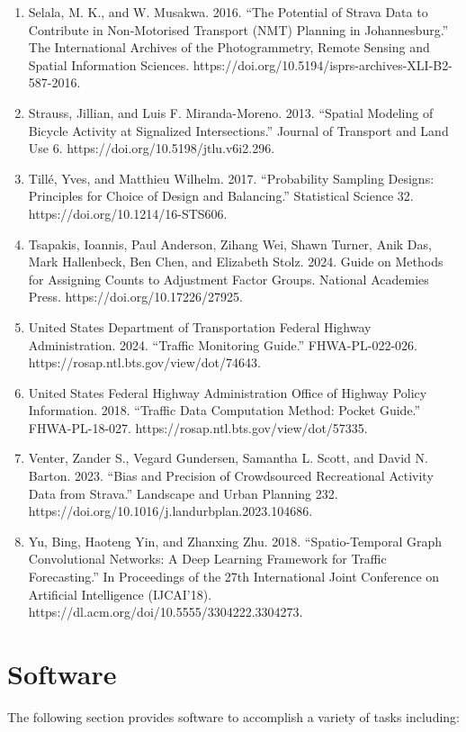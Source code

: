 \documentclass[11pt]{article}
\begin{document}
\begin{enumerate}
\item
  Selala, M. K., and W. Musakwa. 2016. ``The Potential of Strava Data to
  Contribute in Non-Motorised Transport (NMT) Planning in
  Johannesburg.'' The International Archives of the Photogrammetry,
  Remote Sensing and Spatial Information Sciences.
  https://doi.org/10.5194/isprs-archives-XLI-B2-587-2016.
\item
  Strauss, Jillian, and Luis F. Miranda-Moreno. 2013. ``Spatial Modeling
  of Bicycle Activity at Signalized Intersections.'' Journal of
  Transport and Land Use 6. https://doi.org/10.5198/jtlu.v6i2.296.
\item
  Tillé, Yves, and Matthieu Wilhelm. 2017. ``Probability Sampling
  Designs: Principles for Choice of Design and Balancing.'' Statistical
  Science 32. https://doi.org/10.1214/16-STS606.
\item
  Tsapakis, Ioannis, Paul Anderson, Zihang Wei, Shawn Turner, Anik Das,
  Mark Hallenbeck, Ben Chen, and Elizabeth Stolz. 2024. Guide on Methods
  for Assigning Counts to Adjustment Factor Groups. National Academies
  Press. https://doi.org/10.17226/27925.
\item
  United States Department of Transportation Federal Highway
  Administration. 2024. ``Traffic Monitoring Guide.'' FHWA-PL-022-026.
  https://rosap.ntl.bts.gov/view/dot/74643.
\item
  United States Federal Highway Administration Office of Highway Policy
  Information. 2018. ``Traffic Data Computation Method: Pocket Guide.''
  FHWA-PL-18-027. https://rosap.ntl.bts.gov/view/dot/57335.
\item
  Venter, Zander S., Vegard Gundersen, Samantha L. Scott, and David N.
  Barton. 2023. ``Bias and Precision of Crowdsourced Recreational
  Activity Data from Strava.'' Landscape and Urban Planning 232.
  https://doi.org/10.1016/j.landurbplan.2023.104686.
\item
  Yu, Bing, Haoteng Yin, and Zhanxing Zhu. 2018. ``Spatio-Temporal Graph
  Convolutional Networks: A Deep Learning Framework for Traffic
  Forecasting.'' In Proceedings of the 27th International Joint
  Conference on Artificial Intelligence (IJCAI'18).
  https://dl.acm.org/doi/10.5555/3304222.3304273.
\end{enumerate}

    \section{Software}\label{software}

The following section provides software to accomplish a variety of
tasks including:
\end{document}
